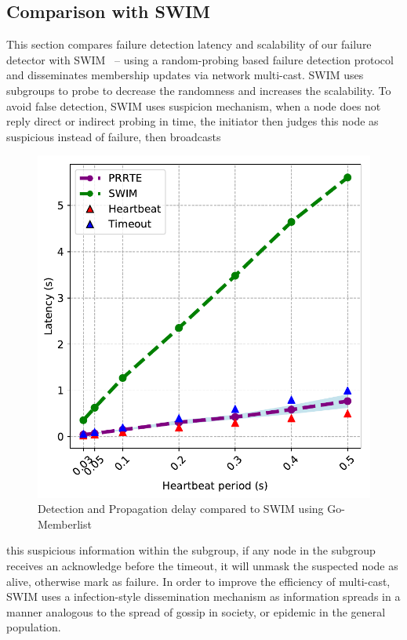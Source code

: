 \documentclass[sigconf]{acmart}
\begin{document}
\subsection{Comparison with SWIM}
This section compares failure detection latency and scalability of our failure detector with SWIM~\cite{Abhinandan02} -- using a random-probing based failure detection protocol and disseminates membership updates via network multi-cast. SWIM uses subgroups to probe to decrease the randomness and increases the scalability. To avoid false detection, SWIM uses suspicion mechanism, when a node does not reply direct or indirect probing in time, the initiator then judges this node as suspicious instead of failure, then broadcasts
\begin{figure}[h]
  \centering
  \includegraphics[width=\linewidth]{HB_prrte_swim.pdf}
  \caption{Detection and Propagation delay compared to SWIM using Go-Memberlist}
  \label{fig:hb_prrte_swim}
\end{figure}
this suspicious information within the subgroup, if any node in the subgroup receives an acknowledge before the timeout, it will unmask the suspected node as alive, otherwise mark as failure. In order to improve the efficiency of multi-cast, SWIM uses a infection-style dissemination mechanism as information spreads in a manner analogous to the spread of gossip in society, or epidemic in the general population.
\end{document}
